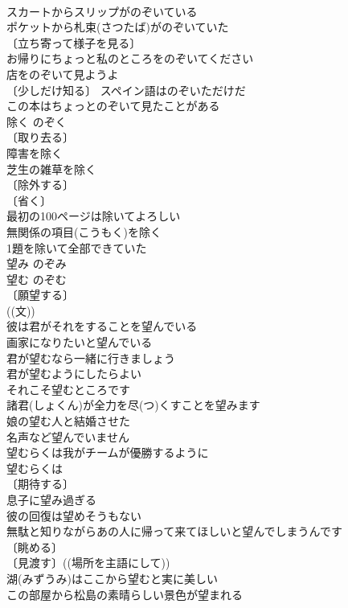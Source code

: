 \documentclass[8pt]{extreport}
\begin{document}
\begin{CJK}{UTF8}{min}
\\	スカートからスリップがのぞいている 
\\	ポケットから札束(さつたば)がのぞいていた 
\\	〔立ち寄って様子を見る〕
\\	お帰りにちょっと私のところをのぞいてください 
\\	店をのぞいて見ようよ 
\\	〔少しだけ知る〕 スペイン語はのぞいただけだ 
\\	この本はちょっとのぞいて見たことがある 
\\	除く	のぞく	
\\	〔取り去る〕
\\	障害を除く 
\\	芝生の雑草を除く 
\\	〔除外する〕
\\	〔省く〕
\\	最初の100ページは除いてよろしい 
\\	無関係の項目(こうもく)を除く 
\\	1題を除いて全部できていた 
\\	望み	のぞみ	
\\	望む	のぞむ	
\\	〔願望する〕
\\	((文)) 
\\	彼は君がそれをすることを望んでいる 
\\	画家になりたいと望んでいる 
\\	君が望むなら一緒に行きましょう 
\\	君が望むようにしたらよい 
\\	それこそ望むところです 
\\	諸君(しょくん)が全力を尽(つ)くすことを望みます 
\\	娘の望む人と結婚させた 
\\	名声など望んでいません 
\\	望むらくは我がチームが優勝するように 
\\	望むらくは　
\\	〔期待する〕
\\	息子に望み過ぎる 
\\	彼の回復は望めそうもない 
\\	無駄と知りながらあの人に帰って来てほしいと望んでしまうんです 
\\	〔眺める〕
\\	〔見渡す〕((場所を主語にして)) 
\\	湖(みずうみ)はここから望むと実に美しい 
\\	この部屋から松島の素晴らしい景色が望まれる 

\end{CJK}
\end{document}
